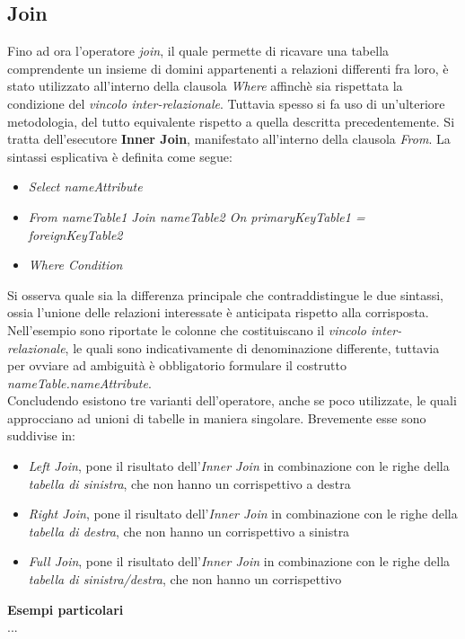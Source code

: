\documentclass{article}
\begin{document}
\subsection*{Join}
\large
Fino ad ora l'operatore \textit{join}, il quale permette di ricavare una tabella comprendente un insieme di domini appartenenti a relazioni differenti fra loro, è stato utilizzato all'interno della clausola \textit{Where} affinchè sia rispettata la condizione del \textit{vincolo inter-relazionale}. Tuttavia spesso si fa uso di un'ulteriore metodologia, del tutto equivalente rispetto a quella descritta precedentemente. Si tratta dell'esecutore \textbf{Inner Join}, manifestato all'interno della clausola \textit{From}. La sintassi esplicativa è definita come segue:
\begin{itemize}[label={ }, leftmargin=1cm]
    \itemsep0em
    \item \textit{Select nameAttribute}
    \item \textit{From nameTable1 Join nameTable2 On primaryKeyTable1 = foreignKeyTable2}
    \item \textit{Where Condition}
\end{itemize} 
Si osserva quale sia la differenza principale che contraddistingue le due sintassi, ossia l'unione delle relazioni interessate è anticipata rispetto alla corrisposta. Nell'esempio sono riportate le colonne che costituiscano il \textit{vincolo inter-relazionale}, le quali sono indicativamente di denominazione differente, tuttavia per ovviare ad ambiguità è obbligatorio formulare il costrutto \textit{nameTable.nameAttribute}.\vspace*{14pt}\\
Concludendo esistono tre varianti dell'operatore, anche se poco utilizzate, le quali approcciano ad unioni di tabelle in maniera singolare. Brevemente esse sono suddivise in:
\begin{itemize}[label={-}]
    \itemsep0em
    \item \textit{Left Join}, pone il risultato dell'\textit{Inner Join} in combinazione con le righe della \textit{tabella di sinistra}, che non hanno un corrispettivo a destra
    \item \textit{Right Join}, pone il risultato dell'\textit{Inner Join} in combinazione con le righe della \textit{tabella di destra}, che non hanno un corrispettivo a sinistra
    \item \textit{Full Join}, pone il risultato dell'\textit{Inner Join} in combinazione con le righe della \textit{tabella di sinistra/destra}, che non hanno un corrispettivo
\end{itemize}
\textbf{Esempi particolari}\\
... 
\end{document}
